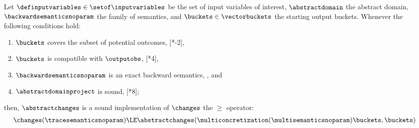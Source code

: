 \begin{lemma}
  Let $\definputvariables\in\setof\inputvariables$ be the set of input variables of interest, $\abstractdomain$ the abstract domain, $\backwardsemanticsnoparam$ the family of semantics, and $\buckets\in\vectorbuckets$ the starting output buckets.
  Whenever the following conditions hold:
  \begin{enumerate}[label=(\roman*)]
    \item \label{tio1} $\buckets$ covers the subset of potential outcomes, \cf{} [*-2],
    \item \label{tio2} $\buckets$ is compatible with $\outputobs$, \cf{} [*4],
    \item \label{tio3} $\backwardsemanticsnoparam$ is an exact backward semantics, \cf{} , and
    \item \label{tio4} $\abstractdomainproject$ is sound, \cf{} [*8];
  \end{enumerate}
  then, $\abstractchanges$ is a sound implementation of $\changes$ \wrt{} the $\ge$ operator:
  \begin{align*}
    \changes(\tracesemanticsnoparam) \LE \abstractchanges(\multiconcretization(\multisemanticsnoparam)\buckets, \buckets)
  \end{align*}
\end{lemma}
